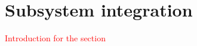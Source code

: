 \documentclass[main.tex]{subfiles}
\begin{document}
\section{Subsystem integration}
\textcolor{red}{Introduction for the section}



\end{document}
